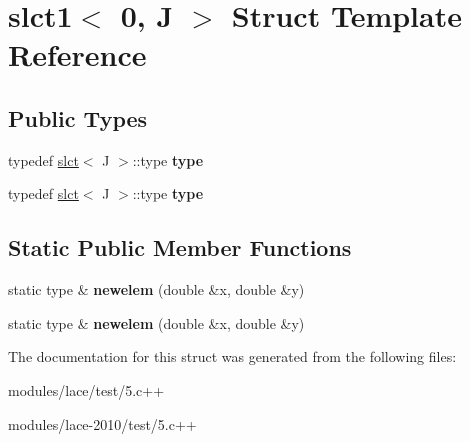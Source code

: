 \hypertarget{structslct1_3_010_00_01J_01_4}{\section{slct1$<$ 0, J $>$ Struct Template Reference}
\label{structslct1_3_010_00_01J_01_4}
}
\subsection*{Public Types}
\begin{DoxyCompactItemize}
\item 
\hypertarget{structslct1_3_010_00_01J_01_4_a60f7bf082a6d6d9bb10fa4d2d8f0d6e7}{typedef \hyperlink{structslct}{slct}$<$ J $>$\-::type {\bfseries type}}\label{structslct1_3_010_00_01J_01_4_a60f7bf082a6d6d9bb10fa4d2d8f0d6e7}

\item 
\hypertarget{structslct1_3_010_00_01J_01_4_a60f7bf082a6d6d9bb10fa4d2d8f0d6e7}{typedef \hyperlink{structslct}{slct}$<$ J $>$\-::type {\bfseries type}}\label{structslct1_3_010_00_01J_01_4_a60f7bf082a6d6d9bb10fa4d2d8f0d6e7}

\end{DoxyCompactItemize}
\subsection*{Static Public Member Functions}
\begin{DoxyCompactItemize}
\item 
\hypertarget{structslct1_3_010_00_01J_01_4_af49e52673d36e0da46afd9f8902feb7b}{static type \& {\bfseries newelem} (double \&x, double \&y)}\label{structslct1_3_010_00_01J_01_4_af49e52673d36e0da46afd9f8902feb7b}

\item 
\hypertarget{structslct1_3_010_00_01J_01_4_af49e52673d36e0da46afd9f8902feb7b}{static type \& {\bfseries newelem} (double \&x, double \&y)}\label{structslct1_3_010_00_01J_01_4_af49e52673d36e0da46afd9f8902feb7b}

\end{DoxyCompactItemize}


The documentation for this struct was generated from the following files\-:\begin{DoxyCompactItemize}
\item 
modules/lace/test/5.\-c++\item 
modules/lace-\/2010/test/5.\-c++\end{DoxyCompactItemize}
